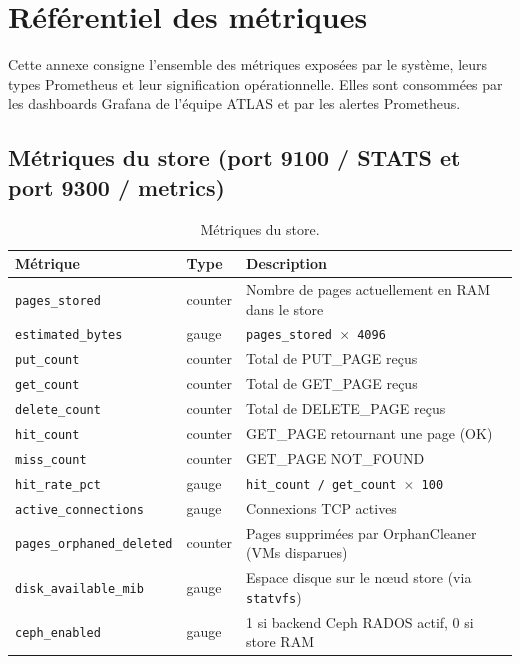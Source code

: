 \chapter{Référentiel des métriques}
\label{annexe:metriques}

Cette annexe consigne l'ensemble des métriques exposées par le système, leurs types Prometheus et leur signification opérationnelle. Elles sont consommées par les dashboards Grafana de l'équipe ATLAS et par les alertes Prometheus.

\section{Métriques du store (port 9100 / STATS et port 9300 / metrics)}

\begin{table}[H]
\centering
\small
\caption{Métriques du store.}
\begin{tabular}{p{4.2cm}lp{8cm}}
\toprule
\textbf{Métrique} & \textbf{Type} & \textbf{Description} \\
\midrule
\texttt{pages\_stored}            & counter & Nombre de pages actuellement en RAM dans le store \\
\texttt{estimated\_bytes}         & gauge   & \texttt{pages\_stored $\times$ 4096} \\
\texttt{put\_count}               & counter & Total de PUT\_PAGE reçus \\
\texttt{get\_count}               & counter & Total de GET\_PAGE reçus \\
\texttt{delete\_count}            & counter & Total de DELETE\_PAGE reçus \\
\texttt{hit\_count}               & counter & GET\_PAGE retournant une page (OK) \\
\texttt{miss\_count}              & counter & GET\_PAGE NOT\_FOUND \\
\texttt{hit\_rate\_pct}           & gauge   & \texttt{hit\_count / get\_count $\times$ 100} \\
\texttt{active\_connections}      & gauge   & Connexions TCP actives \\
\texttt{pages\_orphaned\_deleted} & counter & Pages supprimées par OrphanCleaner (VMs disparues) \\
\texttt{disk\_available\_mib}     & gauge   & Espace disque sur le nœud store (via \texttt{statvfs}) \\
\texttt{ceph\_enabled}            & gauge   & 1 si backend Ceph RADOS actif, 0 si store RAM \\
\bottomrule
\end{tabular}

\end{table}

